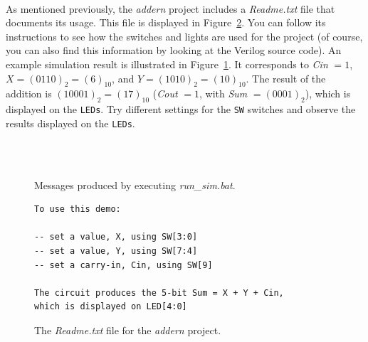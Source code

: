 \documentclass[epsfig,10pt,fullpage]{article} \addtolength{\textwidth}{1.5in}
\begin{document}
~\\
\noindent
As mentioned previously, the {\it addern} project includes a {\it Readme.txt} file that
documents its usage. This file is displayed in Figure~\ref{fig:readme}. You can follow
its instructions to see how the switches and lights are used for the project (of course, 
you can also find this information by looking at the Verilog source code). An example
simulation result is illustrated in Figure~\ref{fig:sim}. It corresponds to {\it Cin} $= 1$,
$X = (0110)_2 = (6)_{10}$, and $Y = (1010)_2 = (10)_{10}$. The result of the addition is
$(10001)_2 = (17)_{10}$ ({\it Cout} $= 1$, with {\it Sum} $= (0001)_2$), which is displayed on 
the \texttt{LEDs}.  Try different settings for the
\texttt{SW} switches and observe the results displayed on the \texttt{LEDs}.

~\\
~\\
\begin{figure}[h]
	\begin{center}
        \setlength{\fboxsep}{0pt}
	\end{center}
          \caption{Messages produced by executing {\it run\_sim.bat}.}
	\label{fig:sim}
\end{figure}

\lstset{language=make,numbers=none,escapechar=|}
\begin{figure}[h]
\begin{center}
\begin{minipage}[t]{12.5 cm}
\begin{lstlisting}[name=top]
To use this demo:

-- set a value, X, using SW[3:0]
-- set a value, Y, using SW[7:4]
-- set a carry-in, Cin, using SW[9]

The circuit produces the 5-bit Sum = X + Y + Cin,
which is displayed on LED[4:0]
\end{lstlisting}
\end{minipage}
    \caption{The {\it Readme.txt} file for the {\it addern} project.}
\label{fig:readme}
\end{center}
\end{figure}
\end{document}
